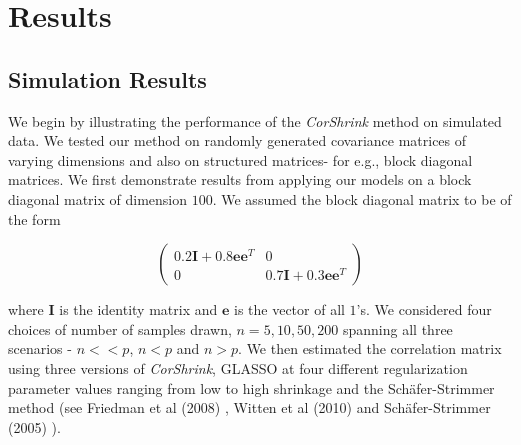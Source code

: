 
\section{Results}

\subsection{Simulation Results}

We begin by illustrating the performance of the \textit{CorShrink} method on simulated data. We tested our method on randomly generated covariance matrices of varying dimensions and also on structured matrices- for e.g., block diagonal matrices. We first demonstrate results from applying our models on a block diagonal matrix of dimension $100$. We assumed the block diagonal matrix to be of the form 

\begin{equation}
\begin{pmatrix}
0.2 \mathbf{I} + 0.8 \mathbf{e} \mathbf{e}^{T}   &             0  \\
  0                             &     0.7 \mathbf{I} + 0.3 \mathbf{e}  \mathbf{e}^{T} 
\end{pmatrix}
\end{equation}
 
where $\mathbf{I}$ is the identity matrix and $\mathbf{e}$ is the vector of all $1$'s. We considered four choices of number of samples drawn, $n = 5, 10, 50, 200$ spanning all three scenarios -  $n << p$, $n <p$ and $ n > p$.  We then estimated the correlation matrix using three versions of \textit{CorShrink}, GLASSO at four different regularization parameter values ranging from low to high shrinkage and the Sch\"{a}fer-Strimmer method (see Friedman et al (2008) \cite{Friedman2008}, Witten et al (2010) \cite{Witten2010} and Sch\"{a}fer-Strimmer (2005) \cite{Schafer2005}). 

